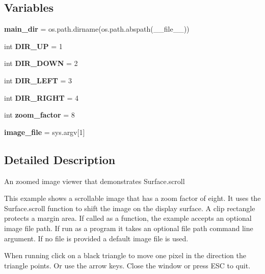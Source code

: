 \subsection*{Variables}
\begin{DoxyCompactItemize}
\item 
\mbox{\label{namespacepygame_1_1examples_1_1scroll_ab94aa0ff696a1c2b3d6e7208489a088a}} 
{\bfseries main\+\_\+dir} = os.\+path.\+dirname(os.\+path.\+abspath(\+\_\+\+\_\+file\+\_\+\+\_\+))
\item 
\mbox{\label{namespacepygame_1_1examples_1_1scroll_adfbacb1635db3116c297ec9aa9ff9694}} 
int {\bfseries D\+I\+R\+\_\+\+UP} = 1
\item 
\mbox{\label{namespacepygame_1_1examples_1_1scroll_ae18a3b265502752ddc031d32a0eb87e4}} 
int {\bfseries D\+I\+R\+\_\+\+D\+O\+WN} = 2
\item 
\mbox{\label{namespacepygame_1_1examples_1_1scroll_aab310f9efab59da29de742bd6c67e952}} 
int {\bfseries D\+I\+R\+\_\+\+L\+E\+FT} = 3
\item 
\mbox{\label{namespacepygame_1_1examples_1_1scroll_a388c95162f7ee8e99995e377136446fb}} 
int {\bfseries D\+I\+R\+\_\+\+R\+I\+G\+HT} = 4
\item 
\mbox{\label{namespacepygame_1_1examples_1_1scroll_a5c21f3008271e253a49e6d9ffbc99777}} 
int {\bfseries zoom\+\_\+factor} = 8
\item 
\mbox{\label{namespacepygame_1_1examples_1_1scroll_ab1665310e7c68afa04a30fd7e7512705}} 
{\bfseries image\+\_\+file} = sys.\+argv\mbox{[}1\mbox{]}
\end{DoxyCompactItemize}


\subsection{Detailed Description}
\begin{DoxyVerb}An zoomed image viewer that demonstrates Surface.scroll

This example shows a scrollable image that has a zoom factor of eight.
It uses the Surface.scroll function to shift the image on the display
surface. A clip rectangle protects a margin area. If called as a function,
the example accepts an optional image file path. If run as a program
it takes an optional file path command line argument. If no file
is provided a default image file is used.

When running click on a black triangle to move one pixel in the direction
the triangle points. Or use the arrow keys. Close the window or press ESC
to quit.\end{DoxyVerb}
 